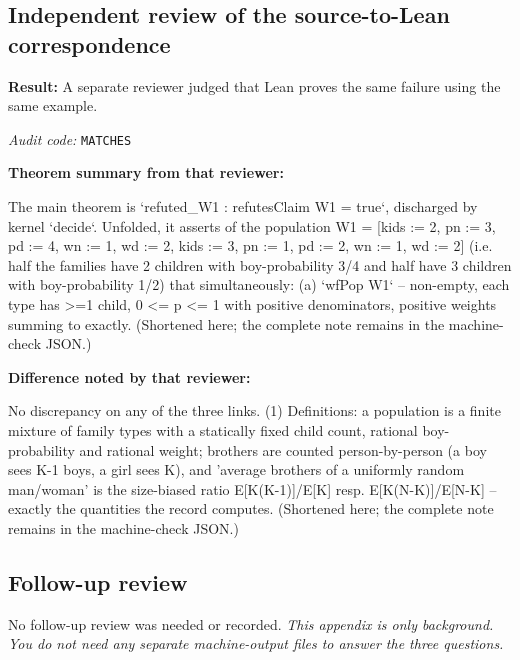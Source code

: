 \documentclass[11pt]{article}
\begin{document}
\subsection*{Independent review of the source-to-Lean correspondence}
\textbf{Result:} A separate reviewer judged that Lean proves the same failure using the same example.
\par\textit{Audit code:} \nolinkurl{MATCHES}
\par\textbf{Theorem summary from that reviewer:}
\begin{Vsrc}
The main theorem is `refuted_W1 : refutesClaim W1 = true`, discharged by kernel `decide`. Unfolded, it asserts of the population W1 = [{kids := 2, pn := 3, pd := 4, wn := 1, wd := 2}, {kids := 3, pn := 1, pd := 2, wn := 1, wd := 2}] (i.e. half the families have 2 children with boy-probability 3/4 and half have 3 children with boy-probability 1/2) that simultaneously: (a) `wfPop W1` -- non-empty, each type has >=1 child, 0 <= p <= 1 with positive denominators, positive weights summing to exactly. (Shortened here; the complete note remains in the machine-check JSON.)
\end{Vsrc}
\par\textbf{Difference noted by that reviewer:}
\begin{Vsrc}
No discrepancy on any of the three links. (1) Definitions: a population is a finite mixture of family types with a statically fixed child count, rational boy-probability and rational weight; brothers are counted person-by-person (a boy sees K-1 boys, a girl sees K), and 'average brothers of a uniformly random man/woman' is the size-biased ratio E[K(K-1)]/E[K] resp. E[K(N-K)]/E[N-K] -- exactly the quantities the record computes. (Shortened here; the complete note remains in the machine-check JSON.)
\end{Vsrc}
\subsection*{Follow-up review}
No follow-up review was needed or recorded.
\textit{This appendix is only background. You do not need any separate machine-output files to answer the three questions.}
\end{document}
